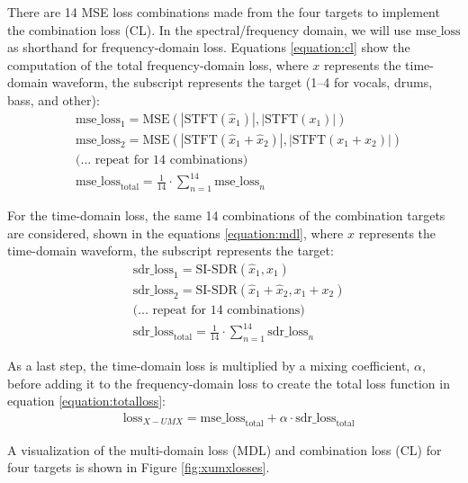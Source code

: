 \documentclass[report.tex]{subfiles}
\begin{document}
There are 14 MSE loss combinations made from the four targets to implement the combination loss (CL). In the spectral/frequency domain, we will use $\text{mse\_loss}$ as shorthand for frequency-domain loss. Equations \eqref{equation:cl} show the computation of the total frequency-domain loss, where $x$ represents the time-domain waveform, the subscript represents the target (1--4 for vocals, drums, bass, and other):
\begin{align}\tag{34}\label{equation:cl}
	\nonumber & \text{mse\_loss}_{1} = \text{MSE}(|\text{STFT}(\hat{x}_{1})|, |\text{STFT}(x_{1})|)\\
	\nonumber & \text{mse\_loss}_{2} = \text{MSE}(|\text{STFT}(\hat{x}_{1} + \hat{x}_{2})|, |\text{STFT}(x_{1} + x_{2})|)\\
	\nonumber & \text{(... repeat for 14 combinations)}\\
	\nonumber & \text{mse\_loss}_{\text{total}} = \frac{1}{14} \cdot \sum_{n = 1}^{14}{\text{mse\_loss}_{n}}
\end{align}

For the time-domain loss, the same 14 combinations of the combination targets are considered, shown in the equations \eqref{equation:mdl}, where $x$ represents the time-domain waveform, the subscript represents the target:
\begin{align}\tag{35}\label{equation:mdl}
	\nonumber & \text{sdr\_loss}_{1} = \text{SI-SDR}(\hat{x}_{1}, x_{1})\\
	\nonumber & \text{sdr\_loss}_{2} = \text{SI-SDR}(\hat{x}_{1} + \hat{x}_{2}, x_{1} + x_{2})\\
	\nonumber & \text{(... repeat for 14 combinations)}\\
	\nonumber & \text{sdr\_loss}_{\text{total}} = \frac{1}{14} \cdot \sum_{n = 1}^{14}{\text{sdr\_loss}_{n}}
\end{align}

As a last step, the time-domain loss is multiplied by a mixing coefficient, $\alpha$, before adding it to the frequency-domain loss to create the total loss function in equation \eqref{equation:totalloss}:
\begin{align}\tag{36}\label{equation:totalloss}
	\nonumber & \text{loss}_{X-UMX} = \text{mse\_loss}_{\text{total}} + \alpha \cdot \text{sdr\_loss}_{\text{total}}
\end{align}

 A visualization of the multi-domain loss (MDL) and combination loss (CL) for four targets is shown in Figure \ref{fig:xumxlosses}.
\end{document}
